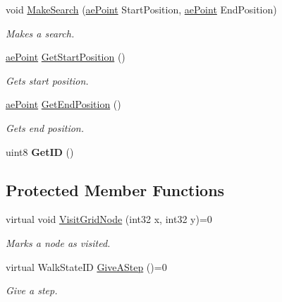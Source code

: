 \begin{DoxyCompactItemize}
void \hyperlink{classae_path_finder_ae3087e7f5c1ef96f1c9f0b3674d93983}{Make\+Search} (\hyperlink{structae_core_1_1ae_point}{ae\+Point} Start\+Position, \hyperlink{structae_core_1_1ae_point}{ae\+Point} End\+Position)
\begin{DoxyCompactList}\small\item\em Makes a search. \end{DoxyCompactList}\item 
\hyperlink{structae_core_1_1ae_point}{ae\+Point} \hyperlink{classae_path_finder_a2b20c5c33afbc05c813f60a57be42a39}{Get\+Start\+Position} ()
\begin{DoxyCompactList}\small\item\em Gets start position. \end{DoxyCompactList}\item 
\hyperlink{structae_core_1_1ae_point}{ae\+Point} \hyperlink{classae_path_finder_a5c5719d519644c25f31bd4edd266383a}{Get\+End\+Position} ()
\begin{DoxyCompactList}\small\item\em Gets end position. \end{DoxyCompactList}\item 
uint8 {\bfseries Get\+ID} ()\hypertarget{classae_path_finder_a444cf0bde9683c6df8645df9223e6d26}{}\label{classae_path_finder_a444cf0bde9683c6df8645df9223e6d26}

\end{DoxyCompactItemize}
\subsection*{Protected Member Functions}
\begin{DoxyCompactItemize}
\item 
virtual void \hyperlink{classae_path_finder_a4ccfa19ff344b9f4827dbeab18c4efab}{Visit\+Grid\+Node} (int32 x, int32 y)=0
\begin{DoxyCompactList}\small\item\em Marks a node as visited. \end{DoxyCompactList}\item 
virtual Walk\+State\+ID \hyperlink{classae_path_finder_a49332ee3be744cac1ece9ffd503ca218}{Give\+A\+Step} ()=0
\begin{DoxyCompactList}\small\item\em Give a step. \end{DoxyCompactList}\end{DoxyCompactItemize}
